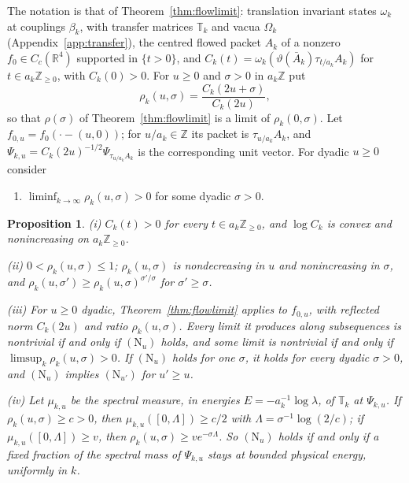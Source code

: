 \documentclass[11pt]{amsart}
\newtheorem{proposition}[theorem]{Proposition}
\theoremstyle{definition}
\theoremstyle{remark}
\numberwithin{equation}{section}
\newcommand{\R}{\mathbb{R}}
\newcommand{\Z}{\mathbb{Z}}
\begin{document}
The notation is that of Theorem~\ref{thm:flowlimit}: translation invariant
states $\omega_k$ at couplings $\beta_k$, with transfer matrices $\mathbb T_k$
and vacua $\Omega_k$ (Appendix~\ref{app:transfer}), the centred flowed packet
$A_k$ of a nonzero $f_0\in C_c(\R^4)$ supported in $\{t>0\}$, and
$C_k(t)=\omega_k(\vartheta(\bar A_k)\tau_{t/a_k}A_k)$ for $t\in a_k\Z_{\ge0}$,
with $C_k(0)>0$. For $u\ge0$ and $\sigma>0$ in $a_k\Z$ put
\[
\rho_k(u,\sigma)=\frac{C_k(2u+\sigma)}{C_k(2u)} ,
\]
so that $\rho(\sigma)$ of Theorem~\ref{thm:flowlimit} is a limit of
$\rho_k(0,\sigma)$. Let $f_{0,u}=f_0(\cdot-(u,0))$; for $u/a_k\in\Z$ its packet
is $\tau_{u/a_k}A_k$, and $\Psi_{k,u}=C_k(2u)^{-1/2}\Psi_{\tau_{u/a_k}A_k}$ is
the corresponding unit vector. For dyadic $u\ge0$ consider
\begin{enumerate}[label=\textup{(N$_u$)},leftmargin=*]
\item $\liminf_{k\to\infty}\rho_k(u,\sigma)>0$ for some dyadic $\sigma>0$.
\end{enumerate}

\begin{proposition}\label{prop:ratioexact}
\textup{(i)} $C_k(t)>0$ for every $t\in a_k\Z_{\ge0}$, and $\log C_k$ is
convex and nonincreasing on $a_k\Z_{\ge0}$.

\textup{(ii)} $0<\rho_k(u,\sigma)\le1$; $\rho_k(u,\sigma)$ is nondecreasing in
$u$ and nonincreasing in $\sigma$, and
$\rho_k(u,\sigma')\ge\rho_k(u,\sigma)^{\sigma'/\sigma}$ for $\sigma'\ge\sigma$.

\textup{(iii)} For $u\ge0$ dyadic, Theorem~\ref{thm:flowlimit} applies to
$f_{0,u}$, with reflected norm $C_k(2u)$ and ratio $\rho_k(u,\sigma)$. Every
limit it produces along subsequences is nontrivial if and only if
$(\mathrm N_u)$ holds, and some limit is nontrivial if and only if
$\limsup_k\rho_k(u,\sigma)>0$. If $(\mathrm N_u)$ holds for one $\sigma$, it
holds for every dyadic $\sigma>0$, and $(\mathrm N_u)$ implies
$(\mathrm N_{u'})$ for $u'\ge u$.

\textup{(iv)} Let $\mu_{k,u}$ be the spectral measure, in energies
$E=-a_k^{-1}\log\lambda$, of $\mathbb T_k$ at $\Psi_{k,u}$. If
$\rho_k(u,\sigma)\ge c>0$, then $\mu_{k,u}([0,\Lambda])\ge c/2$ with
$\Lambda=\sigma^{-1}\log(2/c)$; if $\mu_{k,u}([0,\Lambda])\ge v$, then
$\rho_k(u,\sigma)\ge ve^{-\sigma\Lambda}$. So $(\mathrm N_u)$ holds if and only
if a fixed fraction of the spectral mass of $\Psi_{k,u}$ stays at bounded
physical energy, uniformly in $k$.
\end{proposition}
\end{document}
